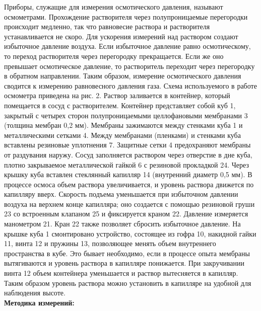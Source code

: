 \documentclass[a4paper, 12pt]{article}%
\begin{document}
    Приборы, служащие для измерения осмотического давления, называют осмометрами. Прохождение растворителя через полупроницаемые перегородки происходит медленно, так что равновесие раствора и растворителя
    устанавливается не скоро. Для ускорения измерений над раствором создают избыточное давление воздуха. Если избыточное давление равно осмотическому, то переход растворителя через перегородку прекращается. Если же оно превышает осмотическое давление, то растворитель переходит через перегородку в обратном направлении. Таким образом, измерение осмотического давления сводится
    к измерению равновесного давления газа. Схема используемого в работе осмометра приведена на рис. 2. Раствор заливается в контейнер,
    который помещается в сосуд с растворителем. Контейнер представляет собой куб 1, закрытый с четырех сторон полупроницаемыми целлофановыми мембранами 3 (толщина
    мембран 0,2 мм). Мембраны зажимаются между стенками куба 1 и металлическими сетками 4. Между мембранами (пленками) и стенками куба вставлены резиновые уплотнения 7. Защитные сетки 4 предохраняют мембраны от раздувания наружу. Сосуд заполняется раствором через отверстие в дне куба, плотно закрываемое металлической гайкой 6 с резиновой прокладкой 24. Через крышку куба вставлен
    стеклянный капилляр 14 (внутренний диаметр 0,5 мм).
    В процессе осмоса объем раствора увеличивается, и уровень раствора движется по
    капилляру вверх. Скорость подъема уменьшается при избыточном давлении воздуха на верхнем конце капилляра; оно создается с помощью резиновой груши 23 со встроенным клапаном 25 и фиксируется краном 22. Давление измеряется манометром 21. Кран 22 также позволяет сбросить избыточное давление. На крышке куба 1 смонтировано устройство, состоящее из гофра 10, накидной гайки 11, винта 12
    и пружины 13, позволяющее менять объем внутреннего пространства в кубе. Это бывает необходимо, если в процессе опыта мембраны вытягиваются и уровень раствора в капилляре понижается. При закручивании винта 12 объем контейнера уменьшается и раствор вытесняется в капилляр. Таким образом
    уровень раствора можно установить в капилляре на удобной для наблюдения высоте.\\
    
    	\textbf{Методика измерений: }\\
    
\end{document}
